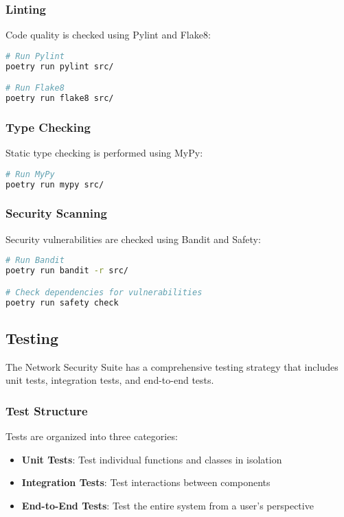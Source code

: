 \subsubsection{Linting}
Code quality is checked using Pylint and Flake8:

\begin{lstlisting}[language=bash, caption=Linting]
# Run Pylint
poetry run pylint src/

# Run Flake8
poetry run flake8 src/
\end{lstlisting}

\subsubsection{Type Checking}
Static type checking is performed using MyPy:

\begin{lstlisting}[language=bash, caption=Type Checking]
# Run MyPy
poetry run mypy src/
\end{lstlisting}

\subsubsection{Security Scanning}
Security vulnerabilities are checked using Bandit and Safety:

\begin{lstlisting}[language=bash, caption=Security Scanning]
# Run Bandit
poetry run bandit -r src/

# Check dependencies for vulnerabilities
poetry run safety check
\end{lstlisting}

\subsection{Testing}
The Network Security Suite has a comprehensive testing strategy that includes unit tests, integration tests, and end-to-end tests.

\subsubsection{Test Structure}
Tests are organized into three categories:

\begin{itemize}
    \item \textbf{Unit Tests}: Test individual functions and classes in isolation
    \item \textbf{Integration Tests}: Test interactions between components
    \item \textbf{End-to-End Tests}: Test the entire system from a user's perspective
\end{itemize}


